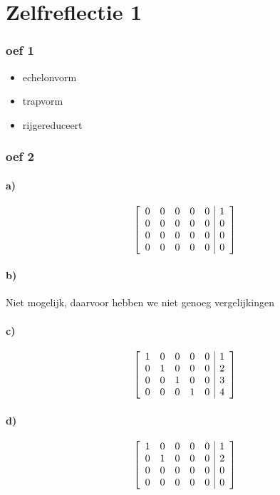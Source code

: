 \documentclass[lineaire_algebra_oplossingen.tex]{subfiles}
\begin{document}
\part{Zelfreflectie 1}
\section{oef 1}
\begin{itemize}
\item echelonvorm
\item trapvorm
\item rijgereduceert
\end{itemize}
\section{oef 2}
\subsection*{a)}
\[
\left[
\begin{array}{l l l l l | r}
0 & 0 & 0 & 0 & 0 & 1\\
0 & 0 & 0 & 0 & 0 & 0\\
0 & 0 & 0 & 0 & 0 & 0\\
0 & 0 & 0 & 0 & 0 & 0\\
\end{array}
\right]
\]
\subsection*{b)}
Niet mogelijk, daarvoor hebben we niet genoeg vergelijkingen
\subsection*{c)}
\[
\left[
\begin{array}{l l l l l | r}
1 & 0 & 0 & 0 & 0 & 1\\
0 & 1 & 0 & 0 & 0 & 2\\
0 & 0 & 1 & 0 & 0 & 3\\
0 & 0 & 0 & 1 & 0 & 4\\
\end{array}
\right]
\]
\subsection*{d)}
\[
\left[
\begin{array}{l l l l l | r}
1 & 0 & 0 & 0 & 0 & 1\\
0 & 1 & 0 & 0 & 0 & 2\\
0 & 0 & 0 & 0 & 0 & 0\\
0 & 0 & 0 & 0 & 0 & 0\\
\end{array}
\right]
\]
\end{document}
